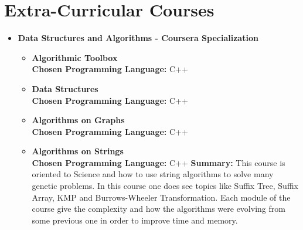 \documentclass[a4paper,10pt]{article} %
\begin{document}
\section{Extra-Curricular Courses}
\begin{itemize}
\item \textbf{Data Structures and Algorithms - Coursera Specialization}
\begin{itemize}
\item \textbf{Algorithmic Toolbox}\\
\textbf{Chosen Programming Language:} C++
\iffalse
\textbf{Summary:} Introduction to different kind of algorithms (Divide and Conquer, Dynamic Programming, Greedy Algorithms, etc). The idea of the course is to provide the students with tools to affront different kind of problems and the best way to solve them.\\
\fi
\item \textbf{Data Structures}\\
\textbf{Chosen Programming Language:} C++
\iffalse
\textbf{Summary:} This course gives a definition of many common data structures, including Arrays, Stacks, Trees, Dynamic Arrays, Priority Queues, Disjoint Sets, Binary Search Trees (Search Trees, AVL Trees, Splays Trees). Also, this course gives a good explanation about how those structures work and are implemented in the most common programming languages.\\
\fi
\item \textbf{Algorithms on Graphs}\\
\textbf{Chosen Programming Language:} C++
\iffalse
\textbf{Summary:} Explanation about graphs and their properties, starting from how is the best way to represent them taking into account the number of nodes and edges, going through how to traverse a graph, find a shortest path and minimum spanning tree. Time and space complexity are the main factor of the described algorithms.
\fi
\item \textbf{Algorithms on Strings}\\
\textbf{Chosen Programming Language:} C++
\iffalse
\textbf{Summary:} This course is oriented to Science and how to use string algorithms to solve many genetic problems. In this course one does see topics like Suffix Tree, Suffix Array, KMP and Burrows-Wheeler Transformation. Each module of the course give the complexity and how the algorithms were evolving from some previous one in order to improve time and memory.

\end{itemize}
\end{itemize}
\end{document}
